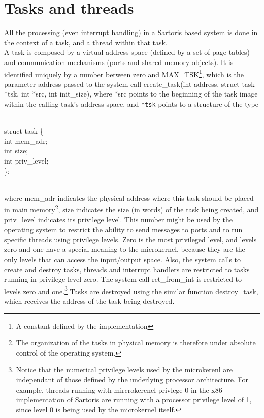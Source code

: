 \documentclass[11pt, letterpaper, twoside, english]{book}
\begin{document}
\section{Tasks and threads}
All the processing (even interrupt handling) in a Sartoris based system is done in the context of a task, and a thread within that task. \\
A task is composed by a virtual address space (defined by a set of page tables) and communication mechanisms (ports and shared memory objects). It is identified uniquely by a number between zero and \textsf{MAX\_TSK}\footnote{A constant defined by the implementation}, which is the parameter \textsf{address} passed to the system call \textsf{create\_task(int address, struct task *tsk, int *src, int init\_size)}, where \textsf{*src} points to the beginning of the task image within the calling task's address space, and \verb|*tsk| points to a structure of the type \\
\\
\begin{sf} \noindent struct task \{ \\
\indent  int mem\_adr; \\
\indent  int size; \\
\indent  int priv\_level; \\
\}; \\
\end{sf}
\\
\noindent where \textsf{mem\_adr} indicates the physical address where this task should be placed in main memory\footnote{The organization of the tasks in physical memory is therefore under absolute control of the operating system.}, \textsf{size} indicates the size (in words) of the task being created, and \textsf{priv\_level} indicates its privilege level. This number might be used by the operating system to restrict the ability to send messages to ports and to run specific threads using privilege levels. Zero is the most privileged level, and levels zero and one have a special meaning to the microkernel, because they are the only levels that can access the input$/$output space. Also, the system calls to create and destroy tasks, threads and interrupt handlers are restricted to tasks running in privilege level zero. The system call \textsf{ret\_from\_int} is restricted to levels zero and one.\footnote{Notice that the numerical privilege levels used by the microkerenl are independant of those defined by the underlying processor architecture. For example, threads running with mircrokerenel privlege 0 in the x86 implementation of Sartoris are running with a processor privilege level of 1, since level 0 is being used by the microkernel itself.}
Tasks are destroyed using the similar function \textsf{destroy\_task}, which receives the address of the task being destroyed.
\end{document}
